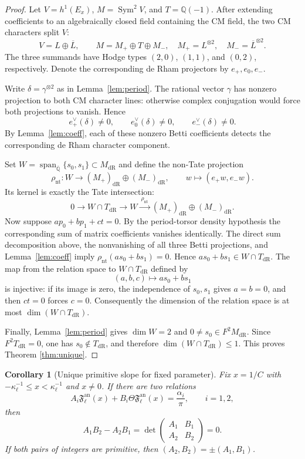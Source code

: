 \documentclass[11pt,a4paper]{amsart} %
\newtheorem{corollary}[theorem]{Corollary}
\theoremstyle{definition}
\newcommand{\Q}{\mathbb Q}
\newcommand{\Qbar}{\overline{\mathbb Q}}
\newcommand{\Sym}{\operatorname{Sym}}
\newcommand{\dR}{\mathrm{dR}}
\begin{document}
\begin{proof}
Let \(V=h^1(E_x)\), \(M=\Sym^2V\), and \(T=\Q(-1)\). After extending
coefficients to an algebraically closed field containing the CM field, the
two CM characters split \(V\):
\[
V=L\oplus\overline L,
\qquad
M=M_+\oplus T\oplus M_-,
\quad
M_+=L^{\otimes2},\quad M_-=\overline L^{\otimes2}.
\]
The three summands have Hodge types \((2,0)\), \((1,1)\), and \((0,2)\),
respectively. Denote the corresponding de Rham projectors by
\(e_+,e_0,e_-\).

Write \(\delta=\gamma^{\otimes2}\) as in Lemma~\ref{lem:period}. The
rational vector \(\gamma\) has nonzero projection to both CM character lines:
otherwise complex conjugation would force both projections to vanish. Hence
\[
e_+^\vee(\delta)\ne0,
\qquad e_0^\vee(\delta)\ne0,
\qquad e_-^\vee(\delta)\ne0.
\]
By Lemma~\ref{lem:coeff}, each of these nonzero Betti coefficients detects
the corresponding de Rham character component.

Set \(W=\operatorname{span}_{\Qbar}\{s_0,s_1\}\subset M_{\dR}\) and define
the non-Tate projection
\[
\rho_{\mathrm{nt}}:W\longrightarrow
(M_+)_{\dR}\oplus(M_-)_{\dR},
\qquad
w\longmapsto(e_+w,e_-w).
\]
Its kernel is exactly the Tate intersection:
\[
0\longrightarrow W\cap T_{\dR}
\longrightarrow W
\xrightarrow{\ \rho_{\mathrm{nt}}\ }
(M_+)_{\dR}\oplus(M_-)_{\dR}.
\]
Now suppose \(ap_0+bp_1+ct=0\). By the period-torsor density hypothesis the
corresponding sum of matrix coefficients vanishes identically. The direct
sum decomposition above, the nonvanishing of all three Betti projections, and
Lemma~\ref{lem:coeff} imply $\rho_{\mathrm{nt}}(as_0+bs_1)=0$. Hence \(as_0+bs_1\in W\cap T_{\dR}\). The map from the relation space
to \(W\cap T_{\dR}\) defined by
\[
(a,b,c)\longmapsto as_0+bs_1
\]
is injective: if its image is zero, the independence of \(s_0,s_1\) gives
\(a=b=0\), and then \(ct=0\) forces \(c=0\). Consequently the dimension
of the relation space is at most \(\dim(W\cap T_{\dR})\).

Finally, Lemma~\ref{lem:period} gives \(\dim W=2\) and
\(0\ne s_0\in F^2M_{\dR}\). Since \(F^2T_{\dR}=0\), one has
\(s_0\notin T_{\dR}\), and therefore $\dim(W\cap T_{\dR})\le1$. This proves Theorem \ref{thm:unique}.
\end{proof}

\begin{corollary}[Unique primitive slope for fixed parameter]\label{cor:slope}
Fix $x=1/C$ with
$-\kappa_\ell^{-1}\le x<\kappa_\ell^{-1}$ and $x\ne0$.  If there are two relations
\[
A_i{\mathfrak F}^{\text{an}}_\ell(x)+B_i\Theta {\mathfrak F}^{\text{an}}_\ell(x)
=\frac{\alpha_i}{\pi},
\qquad i=1,2,
\]
then
\[
A_1B_2-A_2B_1=\det\left(\begin{matrix}
    A_1&B_1\\A_2&B_2
\end{matrix}\right)=0.
\]
If both pairs of integers are primitive, then $(A_2,B_2)=\pm(A_1,B_1)$.
\end{corollary}
\end{document}
